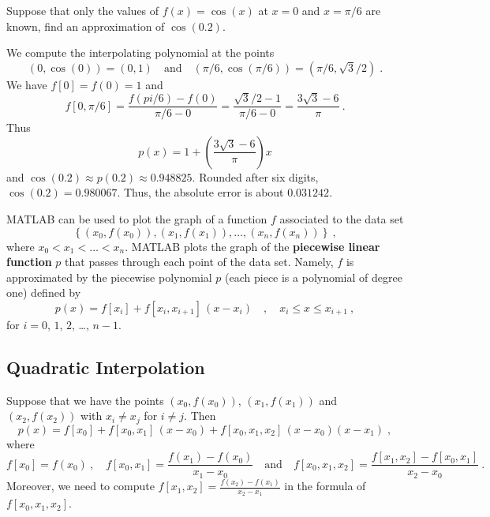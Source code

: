 \begin{egg}
Suppose that only the values of $f(x) = \cos(x)$ at $x=0$ and
$x=\pi/6$ are known, find an approximation of $\cos(0.2)$.

We compute the interpolating polynomial at the points
\[
(0,\cos(0))=(0,1) \quad \text{and} \quad
\left(\pi/6, \cos\left(\pi/6\right)\right)
=\left(\pi/6, \sqrt{3}/2\right) \; .
\]
We have $f[0] = f(0) = 1$ and
\[
f[0,\pi/6]= \frac{f(pi/6) - f(0)}{\pi/6-0}
= \frac{\sqrt{3}/2-1}{\pi/6-0} = \frac{3\sqrt{3}-6}{\pi} \ .
\]
Thus
\[
p(x)=1+\left(\frac{3\sqrt{3}-6}{\pi}\right) x
\]
and $\cos(0.2) \approx p(0.2) \approx 0.948825$.  Rounded after six digits,
$\cos(0.2)=0.980067$.  Thus, the absolute error is about $0.031242$.
\label{cos}
\end{egg}

\begin{rmk}
MATLAB can be used to plot the graph of a function $f$ associated to
the data set
\[
\left\{ (x_0,f(x_0)), (x_1,f(x_1)), \ldots , (x_n,f(x_n)) \right\}
\ ,
\]
where $x_0 < x_1 < \ldots < x_n$.   MATLAB plots the graph of
the {\bfseries piecewise linear function}
$p$ that passes through each
point of the data set.  Namely, $f$ is approximated by the piecewise
polynomial $p$ (each piece is a polynomial of degree one) defined by
\[
p(x) = f[x_i]+f[x_i,x_{i+1}]\,(x-x_i) \quad, \quad  x_i \leq x \leq x_{i+1}
\ ,
\]
for $i=0$, $1$, $2$, \ldots, $n-1$.
\label{matlab}
\end{rmk}

\subsection{Quadratic Interpolation}

Suppose that we have the points $(x_0,f(x_0))$, $(x_1,f(x_1))$ and
$(x_2,f(x_2))$ with $x_i\neq x_j$ for $i\neq j$.  Then
\[
p(x)=f[x_0]+f[x_0,x_1]\,(x-x_0)+f[x_0,x_1,x_2]\,(x-x_0)(x-x_1) \; ,
\]
where
\[
f[x_0] = f(x_0) \ , \quad
f[x_0,x_1] =\frac{f(x_1)-f(x_0)}{x_1-x_0} \quad
\text{and} \quad
f[x_0,x_1,x_2] =\frac{f[x_1,x_2]-f[x_0,x_1]}{x_2-x_0} \ .
\]
Moreover, we need to compute
$\displaystyle f[x_1,x_2] =\frac{f(x_2)-f(x_1)}{x_2-x_1}$ in the
formula of $f[x_0,x_1,x_2]$.

